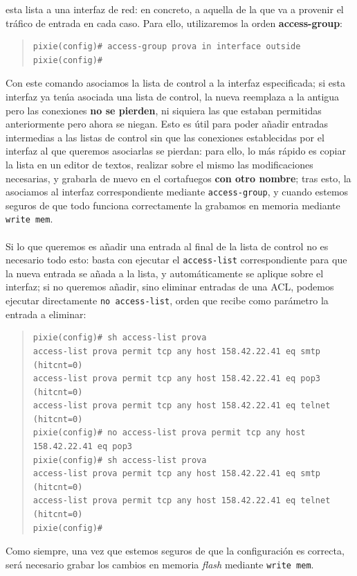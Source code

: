 esta lista a una interfaz de red: en concreto, a aquella de la que va a 
provenir el tr\'afico de entrada en cada caso. Para ello, utilizaremos la orden
{\bf access-group}:
\begin{quote}
\begin{verbatim}
pixie(config)# access-group prova in interface outside
pixie(config)# 
\end{verbatim}
\end{quote}
Con este comando asociamos la lista de control a la interfaz especificada; si 
esta interfaz ya ten\'{\i}a asociada una lista de control, la nueva reemplaza a
la antigua pero las conexiones {\bf no se pierden}, ni siquiera las que estaban
permitidas anteriormente pero ahora se niegan. Esto es \'util para poder 
a\~nadir entradas intermedias a las listas de control sin que las conexiones 
establecidas por el interfaz
al que queremos asociarlas se pierdan: para ello, lo m\'as r\'apido es copiar
la lista en un editor de textos, realizar sobre el mismo las modificaciones 
necesarias, y grabarla de nuevo en el cortafuegos {\bf con otro nombre}; tras
esto, la asociamos al interfaz correspondiente mediante {\tt access-group}, y
cuando estemos seguros de que todo funciona correctamente la grabamos en memoria
mediante {\tt write mem}.\\
\\Si lo que queremos es a\~nadir una entrada al final de la lista de control
no es necesario todo esto: basta con ejecutar el {\tt access-list} 
correspondiente para que la nueva entrada se a\~nada a la lista, y 
autom\'aticamente se aplique sobre el interfaz; si no queremos a\~nadir, sino
eliminar entradas de una ACL, podemos ejecutar directamente {\tt no 
access-list}, orden que recibe como par\'ametro la entrada a eliminar:
\begin{quote}
\begin{verbatim}
pixie(config)# sh access-list prova
access-list prova permit tcp any host 158.42.22.41 eq smtp (hitcnt=0) 
access-list prova permit tcp any host 158.42.22.41 eq pop3 (hitcnt=0) 
access-list prova permit tcp any host 158.42.22.41 eq telnet (hitcnt=0) 
pixie(config)# no access-list prova permit tcp any host 158.42.22.41 eq pop3
pixie(config)# sh access-list prova
access-list prova permit tcp any host 158.42.22.41 eq smtp (hitcnt=0) 
access-list prova permit tcp any host 158.42.22.41 eq telnet (hitcnt=0) 
pixie(config)# 
\end{verbatim}
\end{quote}
Como siempre, una vez que estemos seguros de que la configuraci\'on es correcta,
ser\'a necesario grabar los cambios en memoria {\it flash} mediante {\tt write
mem}.
